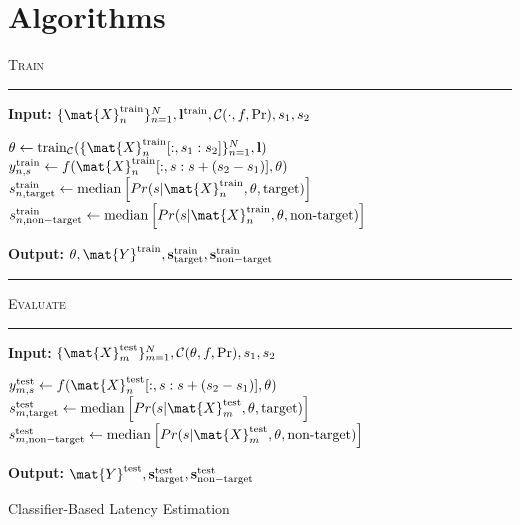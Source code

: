 \section{Algorithms}
\begin{algorithm}[H]
	\textsc{Train}
	\smallskip \hrule \smallskip
	\textbf{Input:} $\{\mat{X}_n^\mathrm{train}\}_{n=1}^N,
  \mathbf{l}^\mathrm{train}, \mathcal{C}(\cdot,f, \Pr), s_1, s_2$
  \begin{algorithmic}[1]
		\State $\theta \gets
			\mathrm{train}_\mathcal{C}(\{\mat{X}_n^\mathrm{train}[:,s_1:s_2]\}_{n=1}^N,\mathbf{l})$
      \State $y_{n,s}^\mathrm{train} \gets f(\mat{X}_n^\mathrm{train}[:,s:s+(s_2-s_1)],\theta)$
        \EndFor
        \State $s_{n,\mathrm{target}}^\mathrm{train} \gets
			    \mathrm{median}\left[Pr(s|\mat{X}_n^\mathrm{train},\theta,\mathrm{target})\right]$
		    \State $s_{n,\mathrm{non-target}}^\mathrm{train}\gets
			    \mathrm{median}\left[Pr(s|\mat{X}_n^\mathrm{train},\theta,\textrm{non-target})\right]$
    \EndFor
	\end{algorithmic}
  \textbf{Output:} $\theta,
  \mat{Y}^\mathrm{train},
  \mathbf{s}_\mathrm{target}^\mathrm{train},
  \mathbf{s}_\mathrm{non-target}^\mathrm{train}$
	\smallskip \hrule \smallskip
	\textsc{Evaluate}
	\smallskip \hrule \smallskip
	\textbf{Input:} $\{\mat{X}_m^\mathrm{test}\}_{m=1}^N, \mathcal{C}(\theta,f, \Pr), s_1, s_2$
  \begin{algorithmic}[1]
      \State $y_{m,s}^\mathrm{test} \gets f(\mat{X}_n^\mathrm{test}[:,s:s+(s_2-s_1)],\theta)$
        \EndFor
        \State $s_{m,\mathrm{target}}^\mathrm{test} \gets
			    \mathrm{median}\left[Pr(s|\mat{X}_m^\mathrm{test},\theta,\mathrm{target})\right]$
		    \State $s_{m,\mathrm{non-target}}^\mathrm{test}\gets
			    \mathrm{median}\left[Pr(s|\mat{X}_m^\mathrm{test},\theta,\textrm{non-target})\right]$
    \EndFor
	\end{algorithmic}
  \textbf{Output:} $\mat{Y}^\mathrm{test},
  \mathbf{s}_\mathrm{target}^\mathrm{test},
  \mathbf{s}_\mathrm{non-target}^\mathrm{test}$

	\caption{Classifier-Based Latency Estimation}
	\label{alg:cble}
\end{algorithm}

